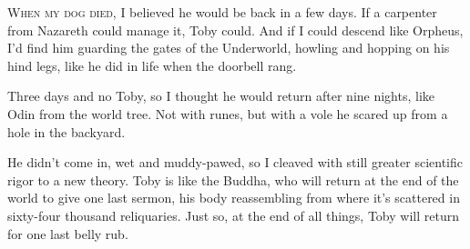 
\lettrine{W}{hen my dog died,}
I believed he would be back in a few days. If a
carpenter from Nazareth could manage it, Toby could. And if I could
descend like Orpheus, I'd find him guarding the gates of the Underworld,
howling and hopping on his hind legs, like he did in life when the
doorbell rang.

Three days and no Toby, so I thought he would return after nine nights,
like Odin from the world tree. Not with runes, but with a vole he scared
up from a hole in the backyard.

He didn't come in, wet and muddy-pawed, so I cleaved with still greater
scientific rigor to a new theory. Toby is like the Buddha, who will
return at the end of the world to give one last sermon, his body
reassembling from where it's scattered in sixty-four thousand
reliquaries. Just so, at the end of all things, Toby will return for one
last belly rub.
